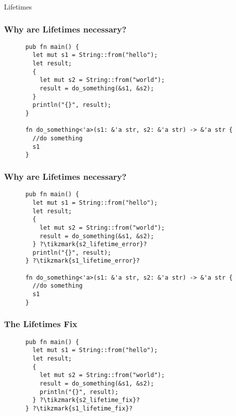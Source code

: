 \begin{section}{Lifetimes}
    \begin{frame}[fragile]
    \frametitle{Why are Lifetimes necessary? \cite{RustLang}}
    \begin{verbatim}
      pub fn main() {
        let mut s1 = String::from("hello");
        let result;
        {
          let mut s2 = String::from("world");
          result = do_something(&s1, &s2);
        }
        println("{}", result);
      }

      fn do_something<'a>(s1: &'a str, s2: &'a str) -> &'a str {
        //do something
        s1
      }
    \end{verbatim}
  \end{frame}

  \begin{frame}[fragile]
    \frametitle{Why are Lifetimes necessary?}
    \begin{verbatim}
      pub fn main() {
        let mut s1 = String::from("hello");
        let result;
        {
          let mut s2 = String::from("world");
          result = do_something(&s1, &s2);
        } ?\tikzmark{s2_lifetime_error}?
        println("{}", result);
      } ?\tikzmark{s1_lifetime_error}?

      fn do_something<'a>(s1: &'a str, s2: &'a str) -> &'a str {
        //do something
        s1
      }
    \end{verbatim}
  \end{frame}

  \begin{frame}[fragile]
    \frametitle{The Lifetimes Fix}
    \begin{verbatim}
      pub fn main() {
        let mut s1 = String::from("hello");
        let result;
        {
          let mut s2 = String::from("world");
          result = do_something(&s1, &s2);
          println("{}", result);
        } ?\tikzmark{s2_lifetime_fix}?
      } ?\tikzmark{s1_lifetime_fix}?


\end{verbatim}
\end{frame}
\end{section}
